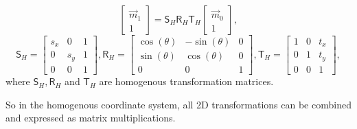 \begin{equation}
    \begin{bmatrix} \vec{m}_1 \\ 1 \end{bmatrix} = 
    \pmb{\mathsf{S}}_H \pmb{\mathsf{R}}_H \pmb{\mathsf{T}}_H
    \begin{bmatrix} \vec{m}_0 \\ 1 \end{bmatrix},
\end{equation}
\begin{equation}
    \pmb{\mathsf{S}}_H = \begin{bmatrix} s_x & 0 & 1\\ 0 & s_y & 1 \\ 0 & 0 & 1\end{bmatrix}, \pmb{\mathsf{R}}_H = \begin{bmatrix} \cos(\theta) & -\sin(\theta) & 0 \\ \sin(\theta) & \cos(\theta) & 0 \\ 0 & 0 & 1 \end{bmatrix}, \pmb{\mathsf{T}}_H = \begin{bmatrix} 1 & 0 & t_x\\ 0 & 1 & t_y \\ 0 & 0 & 1 \end{bmatrix} ,
\end{equation}
where $\pmb{\mathsf{S}}_H, \pmb{\mathsf{R}}_H$ and $\pmb{\mathsf{T}}_H$ are homogenous transformation matrices.

So in the homogenous coordinate system, all 2D transformations can be combined and expressed as matrix multiplications.




